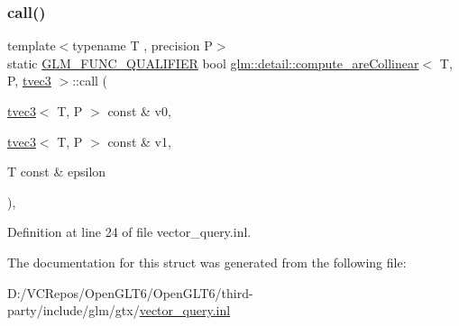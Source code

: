 \subsubsection{\texorpdfstring{call()}{call()}}
{\footnotesize\ttfamily template$<$typename T , precision P$>$ \\
static \mbox{\hyperlink{setup_8hpp_a33fdea6f91c5f834105f7415e2a64407}{G\+L\+M\+\_\+\+F\+U\+N\+C\+\_\+\+Q\+U\+A\+L\+I\+F\+I\+ER}} bool \mbox{\hyperlink{structglm_1_1detail_1_1compute__are_collinear}{glm\+::detail\+::compute\+\_\+are\+Collinear}}$<$ T, P, \mbox{\hyperlink{structglm_1_1tvec3}{tvec3}} $>$\+::call (\begin{DoxyParamCaption}\item[{\mbox{\hyperlink{structglm_1_1tvec3}{tvec3}}$<$ T, P $>$ const \&}]{v0,  }\item[{\mbox{\hyperlink{structglm_1_1tvec3}{tvec3}}$<$ T, P $>$ const \&}]{v1,  }\item[{T const \&}]{epsilon }\end{DoxyParamCaption})\hspace{0.3cm}{\ttfamily [inline]}, {\ttfamily [static]}}



Definition at line 24 of file vector\+\_\+query.\+inl.



The documentation for this struct was generated from the following file\+:\begin{DoxyCompactItemize}
\item 
D\+:/\+V\+C\+Repos/\+Open\+G\+L\+T6/\+Open\+G\+L\+T6/third-\/party/include/glm/gtx/\mbox{\hyperlink{vector__query_8inl}{vector\+\_\+query.\+inl}}\end{DoxyCompactItemize}
